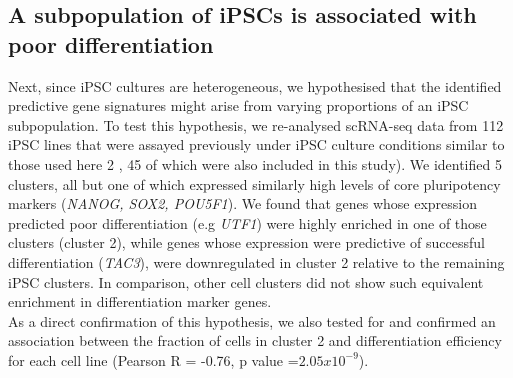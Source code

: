 \newpage

\subsection{A subpopulation of iPSCs is associated with poor differentiation}

Next, since iPSC cultures are heterogeneous, we hypothesised that the identified predictive gene signatures might arise from varying proportions of an iPSC subpopulation. 
To test this hypothesis, we re-analysed scRNA-seq data from 112 iPSC lines that were assayed previously under iPSC culture conditions similar to those used here 2 
\cite{cuomo2020single}, 45 of which were also included in this study). 
We identified 5 clusters, all but one of which expressed similarly high levels of core pluripotency markers (\textit{NANOG, SOX2, POU5F1}). 
We found that genes whose expression predicted poor differentiation (e.g \textit{UTF1}) were highly enriched in one of those clusters (cluster 2), while genes whose expression were predictive of successful differentiation (\textit{TAC3}), were downregulated in cluster 2 relative to the remaining iPSC clusters. 
In comparison, other cell clusters did not show such equivalent enrichment in differentiation marker genes.\\

As a direct confirmation of this hypothesis, we also tested for and confirmed an association between the fraction of cells in cluster 2 and differentiation efficiency for each cell line (Pearson R = -0.76, p value =$2.05x10^{-9}$). 

